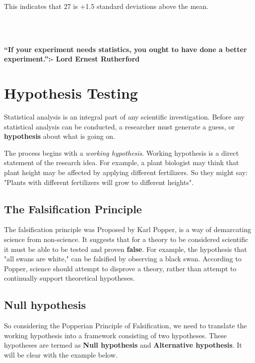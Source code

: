 \documentclass[
]{book}
\begin{document}
This indicates that 27 is +1.5 standard deviations above the mean.

~\\
\hspace*{0.333em}\\
\hspace*{0.333em}

\hypertarget{hello}{}
\textbf{``If your experiment needs statistics, you ought to have done a better experiment.'':- Lord Ernest Rutherford}

\hypertarget{hypothesis-testing}{%
\chapter{Hypothesis Testing}\label{hypothesis-testing}}

Statistical analysis is an integral part of any scientific
investigation. Before any statistical analysis can be conducted, a researcher must generate a guess, or \textbf{hypothesis} about what is going on.

The process begins with a \emph{working hypothesis}. Working hypothesis is a direct statement of the research idea. For example, a plant biologist may think that plant height may be affected by applying different fertilizers. So they might say: "Plants with different fertilizers will grow to different heights".

\hypertarget{the-falsification-principle}{%
\section*{The Falsification Principle}\label{the-falsification-principle}}

The falsification principle was Proposed by Karl Popper, is a way of demarcating science from non-science. It suggests that for a theory to be considered scientific it must be able to be tested and proven \textbf{false}. For example, the hypothesis that "all swans are white," can be falsified by observing a black swan. According to Popper, science should attempt to disprove a theory, rather than attempt to continually support theoretical hypotheses.

\hypertarget{null-hypothesis}{%
\section{Null hypothesis}\label{null-hypothesis}}

So considering the Popperian Principle of Falsification, we need to translate the working hypothesis into a framework consisting of two hypotheses. These hypotheses are termed as \textbf{Null hypothesis} and \textbf{Alternative hypothesis}. It will be clear with the example below.
\end{document}

